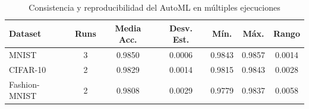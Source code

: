 \begin{table}[htbp]
\centering
\caption{Consistencia y reproducibilidad del AutoML en múltiples ejecuciones}
\label{tab:reproducibilidad}
\begin{tabular}{lcccccc}
\toprule
\textbf{Dataset} & \textbf{Runs} & \textbf{Media Acc.} & \textbf{Desv. Est.} & \textbf{Mín.} & \textbf{Máx.} & \textbf{Rango} \\
\midrule
  MNIST & 3 & 0.9850 & 0.0006 & 0.9843 & 0.9857 & 0.0014 \\
  CIFAR-10 & 2 & 0.9829 & 0.0014 & 0.9815 & 0.9843 & 0.0028 \\
  Fashion-MNIST & 2 & 0.9808 & 0.0029 & 0.9779 & 0.9837 & 0.0058 \\
\bottomrule
\end{tabular}
\end{table}